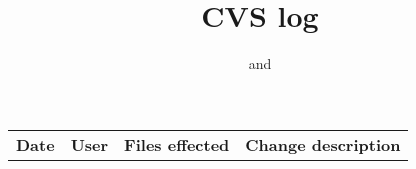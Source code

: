 \documentclass[12pt,titlepage]{article}
\title{CVS log}
\author{\cha{} and \dav}
\begin{document}
\begin{longtable}{|p{2cm}|p{1.2cm}|p{6cm}|p{6cm}|}
\hline
\textbf{Date} & \textbf{User} & \textbf{Files effected} & \textbf{Change description}
\endhead
\hline



\end{longtable}
\end{document}
